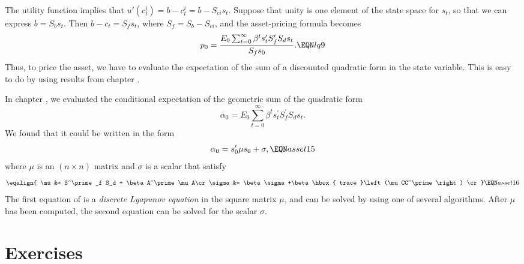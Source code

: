 The utility function  implies that $u'(c^i_t) = b-c^i_t =
b - S_{ci} s_t$.
 Suppose that unity is one element of the state space for
$s_t$, so that we can express $b = S_b s_t$.    Then $b -c_t =
S_f s_t$, where $S_f = S_b - S_{ci}$, and
the asset-pricing formula becomes
$$ p_0 = {E_0  \sum_{t=0}^\infty \beta^t  s_t' S_f' S_d s_t \over S_f s_0} .
    \EQN lq9  $$
Thus, to price the asset, we have to evaluate the expectation
of the  sum of a discounted quadratic form in the state
variable.  This is easy to do by
 using results from chapter .


In chapter , we evaluated  the conditional expectation of the
geometric sum of the quadratic form
$$
  \alpha_0 = E_0 \sum^\infty_{t=0} \beta^t
s^\prime_t S^\prime_f S_d s_t.
 $$
We found that it could be written in the form
$$\alpha_0 = s^\prime_0 \mu s_0 + \sigma, \EQN asset15$$
where $\mu$ is an $(n\times n)$ matrix and $\sigma$ is a scalar
that satisfy
$$\eqalign{ \mu &= S^\prime_f S_d + \beta A^\prime \mu A\cr
\sigma &= \beta \sigma +\beta \hbox{ trace }\left(\mu CC^\prime
\right) \cr} \EQN asset16$$
The first equation of  is a {\it discrete Lyapunov
equation\/} in the square matrix $\mu$, and can be solved by using
one of several algorithms.
  After $\mu$ has been computed, the second equation can be
solved for the scalar $\sigma$.  

%

\showchaptIDfalse
\showsectIDfalse
\section{Exercises}
\showchaptIDtrue
\showsectIDtrue
\medskip
{}  


